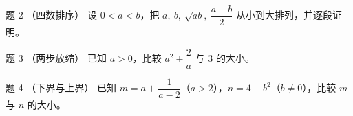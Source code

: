 \begin{problem}{题 2 （四数排序）}
设 $0<a<b$，把 $a,\ b,\ \sqrt{ab},\ \dfrac{a+b}{2}$ 从小到大排列，并逐段证明。
\end{problem}

\begin{problem}{题 3 \starred（两步放缩）}
已知 $a>0$，比较 $a^2+\dfrac{2}{a}$ 与 $3$ 的大小。
\end{problem}

\begin{problem}{题 4 （下界与上界）}
已知 $m=a+\dfrac{1}{a-2}$（$a>2$），$n=4-b^2$（$b\ne 0$），比较 $m$ 与 $n$ 的大小。
\end{problem}

\clearpage
